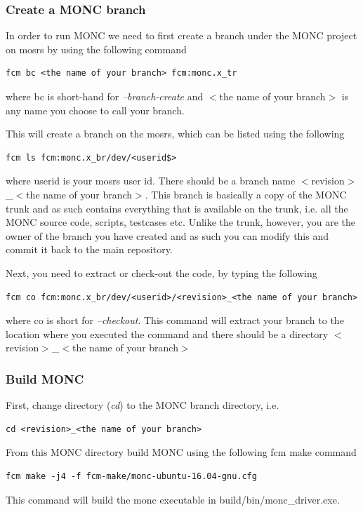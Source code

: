 \documentclass[a4paper,11pt]{article}
\begin{document}
\subsubsection{Create a MONC branch}

In order to run MONC we need to first create a branch under the MONC project
on mosrs by using the following command

\begin{lstlisting}
fcm bc <the name of your branch> fcm:monc.x_tr
\end{lstlisting}

where bc is short-hand for \emph{--branch-create} and $<$the name of your branch$>$ is
any name you choose to call your branch.

This will create a branch on the mosrs, which can be listed using the following

\begin{lstlisting}
fcm ls fcm:monc.x_br/dev/<userid$>
\end{lstlisting}

where userid is your mosrs user id. There should be a branch name
$<$revision$>$\_$<$the name of your branch$>$. This branch is basically a copy of
the MONC trunk and as such contains everything that is available on the trunk,
i.e. all the MONC source code, scripts, testcases etc. Unlike the trunk, however,
you are the owner of the branch you have created and as such you can modify this
and commit it back to the main repository.

Next, you need to extract or check-out the code, by typing the following

\begin{lstlisting}
fcm co fcm:monc.x_br/dev/<userid>/<revision>_<the name of your branch>
\end{lstlisting}

where co is short for \emph{--checkout}. This command will extract your branch
 to the location where you executed the command and there should
be a directory $<$revision$>$\_$<$the name of your branch$>$

\subsubsection{Build MONC}

First, change directory (\emph{cd}) to the MONC branch directory, i.e.
\begin{lstlisting}
cd <revision>_<the name of your branch>
\end{lstlisting}
From this MONC directory build MONC using the following fcm make command
\begin{lstlisting}
fcm make -j4 -f fcm-make/monc-ubuntu-16.04-gnu.cfg
\end{lstlisting}
This command will build the monc executable in build/bin/monc\_driver.exe.
\end{document}
